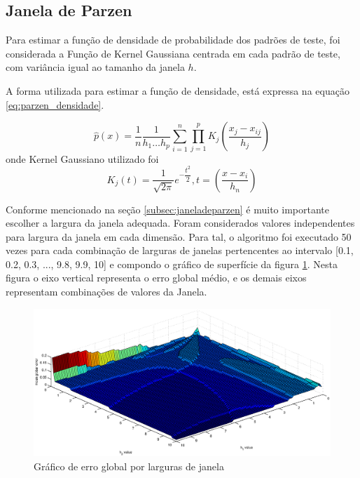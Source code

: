 \subsection{Janela de Parzen}
\label{subsec:exp-janeladeparzen}

Para estimar a função de densidade de probabilidade dos padrões de teste, foi considerada a Função de Kernel Gaussiana centrada em cada padrão de teste, com variância igual ao tamanho da janela $h$.

A forma utilizada para estimar a função de densidade, está expressa na equação \ref{eq:parzen_densidade}.

\begin{equation}
\label{eq:parzen_densidade}
\hat{p}(x) = \dfrac{1}{n} \dfrac{1}{h_1 \ldots h_p} \sum_{i = 1}^{n}\prod_{j = 1}^{p} K_j \left (\dfrac{x_j - x_{ij}}{h_j} \right )
\end{equation}
onde Kernel Gaussiano utilizado foi
\begin{equation}
\label{eq:kernel}
K_j(t) = \dfrac{1}{\sqrt{2\pi}} e^{- \dfrac{t^2}{2}}, t = \left (\dfrac{x - x_i}{h_n} \right)
\end{equation}

Conforme mencionado na seção \ref{subsec:janeladeparzen} é muito importante escolher a largura da janela adequada. Foram considerados valores independentes para largura da janela em cada dimensão. Para tal, o algoritmo foi executado 50 vezes para cada combinação de larguras de janelas pertencentes ao intervalo [0.1, 0.2, 0.3, ..., 9.8, 9.9, 10] e compondo o gráfico de superfície da figura \ref{fig:sup_parzen}. Nesta figura o eixo vertical representa o erro global médio, e os demais eixos representam combinações de valores da Janela.

\begin{figure}[H]
\center
\includegraphics[scale=0.60]{imagens/resultados/globalErrorsPerHValue.eps}
\caption{Gráfico de erro global por larguras de janela}
\label{fig:sup_parzen}
\end{figure}

